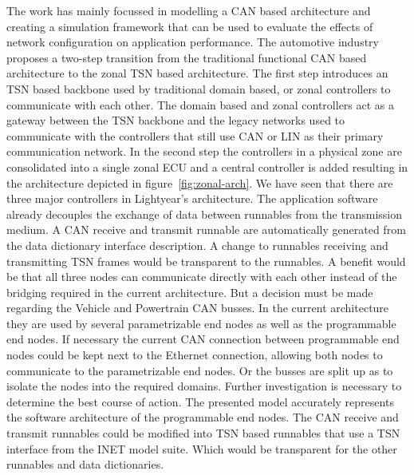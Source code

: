 The work has mainly focussed in modelling a CAN based architecture and creating a simulation framework that can be used to evaluate the effects of network configuration on application performance. The automotive industry proposes a two-step transition from the traditional functional CAN based architecture to the zonal TSN based architecture. The first step introduces an TSN based backbone used by traditional domain based, or zonal controllers to communicate with each other. The domain based and zonal controllers act as a gateway between the TSN backbone and the legacy networks used to communicate with the controllers that still use CAN or LIN as their primary communication network. In the second step the controllers in a physical zone are consolidated into a single zonal ECU and a central controller is added resulting in the architecture depicted in figure~\ref{fig:zonal-arch}. We have seen that there are three major controllers in Lightyear's architecture. The application software already decouples the exchange of data between runnables from the transmission medium. A CAN receive and transmit runnable are automatically generated from the data dictionary interface description. A change to runnables receiving and transmitting TSN frames would be transparent to the runnables. A benefit would be that all three nodes can communicate directly with each other instead of the bridging required in the current architecture. But a decision must be made regarding the Vehicle and Powertrain CAN busses. In the current architecture they are used by several parametrizable end nodes as well as the programmable end nodes. If necessary the current CAN connection between programmable end nodes could be kept next to the Ethernet connection, allowing both nodes to communicate to the parametrizable end nodes. Or the busses are split up as to isolate the nodes into the required domains. Further investigation is necessary to determine the best course of action. The presented model accurately represents the software architecture of the programmable end nodes. The CAN receive and transmit runnables could be modified into TSN based runnables that use a TSN interface from the INET model suite. Which would be transparent for the other runnables and data dictionaries.